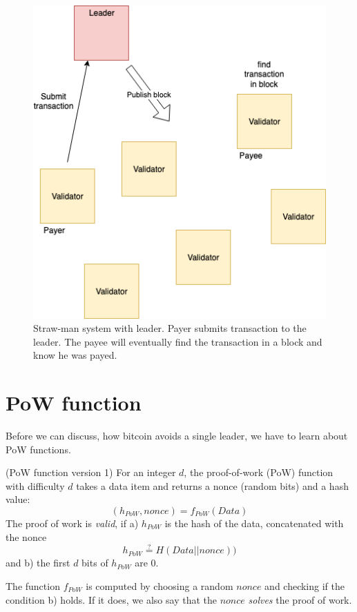 \begin{figure}
	\includegraphics{fig/Leader}
	\caption{Straw-man system with leader. Payer submits transaction to the leader. The payee will eventually find the transaction in a block and know he was payed.}
	\label{fig:leader}
\end{figure}

\pagebreak
\section{PoW function}
Before we can discuss, how bitcoin avoids a single leader, we have to learn about PoW functions.

\begin{definition}\label{def:pow1}
	(PoW function version 1)
	For an integer $d$,
	the proof-of-work (PoW) function with difficulty $d$ takes a data item and returns a nonce (random bits) and a hash value:
	\[
		(h_{PoW}, nonce)=f_{PoW}(Data)
	\]
	The proof of work is \emph{valid}, if a) $h_{PoW}$ is the hash of the data, concatenated with the nonce
	\[
		h_{PoW} \overset{?}{=}H(Data || nonce))
	\]
	and b) the first $d$ bits of $h_{PoW}$ are 0.
\end{definition}

\begin{note}
	The function $f_{PoW}$ is computed by choosing a random $nonce$ and checking if the condition b) holds. If it does, we also say that the $nonce$ 
	\emph{solves} the proof of work.
\end{note}

